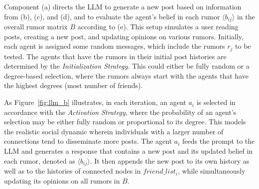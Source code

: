 Component (a) directs the LLM to generate a new post based on information from (b), (c), and (d), and to evaluate the agent’s belief in each rumor $\langle b_{ij} \rangle$ in the overall rumor matrix $B$ according to (e). 
This setup simulates a user reading posts, creating a new post, and updating opinions on various rumors. Initially, each agent is assigned some random messages, which include the rumors $r_j$ to be tested. 
The agents that have the rumors in their initial post histories are determined by the \textit{Initialization Strategy}. This could either be fully random or a degree-based selection, where the rumors always start with the agents that have the highest degrees (most number of friends).

As Figure~\ref{fig:llm_b} illustrates, in each iteration, an agent $a_i$ is selected in accordance with the \textit{Activation Strategy}, where the probability of an agent's selection may be either fully random or proportional to its degree. This models the realistic social dynamic wherein individuals with a larger number of connections tend to disseminate more posts. The agent $a_i$ feeds the prompt to the LLM and generates a response that contains a new post and its updated belief in each rumor, denoted as $\langle b_{ij} \rangle$. It then appends the new post to its own history as well as to the histories of connected nodes in $friend\_list_i$, while simultaneously updating its opinions on all rumors in $B$.




